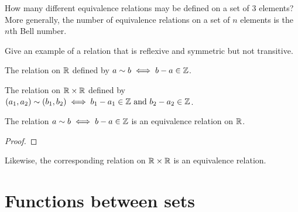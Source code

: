 \begin{exercise}[I.1.4]
  \label{exer:prelims:1.4}
  How many different equivalence relations may be defined on a set of
  $3$ elements? More generally, the number of equivalence relations on
  a set of $n$ elements is the $n$th Bell number.
\end{exercise}

\begin{exercise}[I.1.5]
  \label{exer:prelims:1.5}
  Give an example of a relation that is reflexive and symmetric but not
  transitive.
\end{exercise}

\begin{definition}
  \label{def:prelims:mod-z-relation}
  \leanok
  The relation on $\mathbb{R}$ defined by $a \sim b \iff b - a \in \mathbb{Z}$.
\end{definition}

\begin{definition}
  \label{def:prelims:mod-z-relation-plane}
  \leanok
  The relation on $\mathbb{R} \times \mathbb{R}$ defined by
  $(a_1,a_2) \sim (b_1,b_2) \iff b_1-a_1 \in \mathbb{Z} \text{ and } b_2-a_2 \in
  \mathbb{Z}$.
\end{definition}

\begin{exercise}
  \label{exer:prelims:1.6a}
  \leanok
  The relation $a \sim b \iff b - a \in \mathbb{Z}$ is an equivalence relation
  on $\mathbb{R}$.
\end{exercise}
\begin{proof}
  \leanok
\end{proof}

\begin{exercise}
  \label{exer:prelims:1.6b}
  Likewise, the corresponding relation on $\mathbb{R} \times \mathbb{R}$ is an
  equivalence relation.
\end{exercise}

\section{Functions between sets}
\label{sec:prelims:functions-between-sets}

